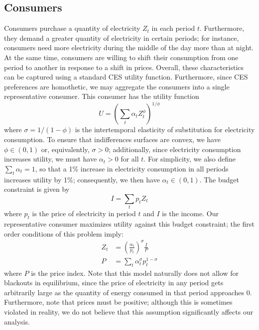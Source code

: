 \documentclass[11pt,a4paper]{extarticle}
\begin{document}
\subsection{Consumers}
\label{sec:consumers}

Consumers purchase a quantity of electricity $Z_t$ in each period $t$. Furthermore, they demand a greater quantity of electricity in certain periods; for instance, consumers need more electricity during the middle of the day more than at night. At the same time, consumers are willing to shift their consumption from one period to another in response to a shift in prices. Overall, these characteristics can be captured using a standard CES utility function.  Furthermore, since CES preferences are homothetic, we may aggregate the consumers into a single representative consumer. This consumer has the utility function
\begin{equation}
U = \left( \sum_t \alpha_t Z_t^\phi  \right)^{1/\phi}
\end{equation}
where $\sigma = 1/(1-\phi)$ is the intertemporal elasticity of substitution for electricity consumption. To ensure that indifferences surfaces are convex, we have $\phi \in (0,1)$ or, equivalently,  $\sigma > 0$; additionally, since electricity consumption increases utility, we must have $\alpha_t > 0$ for all $t$.  For simplicity, we also define $\sum_t \alpha_t = 1$, so that a 1\% increase in electricity consumption in all periods increases utility by 1\%; consequently, we then have $\alpha_t \in (0,1)$. The budget constraint is given by
\begin{equation}
I = \sum_t p_t Z_t
\end{equation}
where $p_t$ is the price of electricity in period $t$ and $I$ is the income. Our representative consumer maximizes utility against this budget constraint; the first order conditions of this problem imply:
\begin{align}
Z_t &= \left(\frac{\alpha_t}{p_t} \right)^\sigma \frac{I}{P} \\
P &= \sum_t \alpha_t^\sigma p_t^{1-\sigma}
\end{align}
where $P$ is the price index. Note that this model naturally does not allow for blackouts in equilibrium, since the price of electricity in any period gets arbitrarily large as the quantity of energy consumed in that period approaches 0. Furthermore, note that prices must be positive; although this is sometimes violated in reality, we do not believe that this assumption significantly affects our analysis. 
\end{document}
